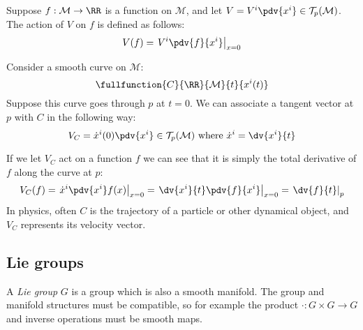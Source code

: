 \documentclass{jknotes}
\begin{document}
Suppose \(f:\mathcal{M}\rightarrow\RR\) is a function on \(\mathcal{M}\), and let \(V=V^i\pdv{x^i} \in \mathcal{T}_p(\mathcal{M})\).
The action of \(V\) on \(f\) is defined as follows:
\begin{equation}
    V(f) = \left.V^i\pdv{f}{x^i}\right|_{x=0}
\end{equation}

Consider a smooth curve on \(\mathcal{M}\):
\begin{equation}
    \fullfunction{C}{\RR}{\mathcal{M}}{t}{x^i(t)}
\end{equation}
Suppose this curve goes through \(p\) at \(t=0\). We can associate a tangent vector at \(p\) with \(C\) in the following way:
\begin{equation}
    V_C = \dot{x}^i(0)\pdv{x^i} \in \mathcal{T}_p(\mathcal{M}) \text{ where } \dot{x}^i = \dv{x^i}{t}
\end{equation}
\begin{figure}[H]
    \centering
\end{figure}
If we let \(V_C\) act on a function \(f\) we can see that it is simply the total derivative of \(f\) along the curve at \(p\):
\begin{equation}
    V_C(f) = \left.\dot{x}^i\pdv{x^i}f(x)\right|_{x=0} = \left.\dv{x^i}{t}\pdv{f}{x^i}\right|_{x=0} = \left.\dv{f}{t}\right|_p
\end{equation}
In physics, often \(C\) is the trajectory of a particle or other dynamical object, and \(V_C\) represents its velocity vector.

\subsection{Lie groups}

\begin{defn}
    A \emph{Lie group} \(G\) is a group which is also a smooth manifold. The group and manifold structures must be compatible, so for example the product \(\cdot : G \times G \rightarrow G\) and inverse operations must be smooth maps.
\end{defn}
\end{document}

